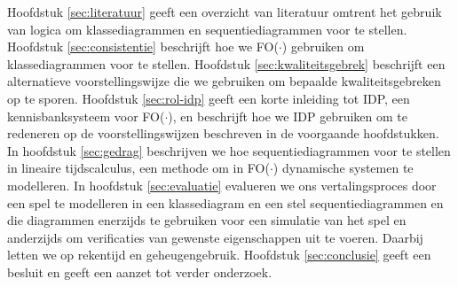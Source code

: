 Hoofdstuk \ref{sec:literatuur} geeft een overzicht van literatuur omtrent het gebruik van logica om klassediagrammen en sequentiediagrammen voor te stellen. Hoofdstuk \ref{sec:consistentie} beschrijft hoe we FO($\cdot$) gebruiken om klassediagrammen voor te stellen. Hoofdstuk \ref{sec:kwaliteitsgebrek} beschrijft een alternatieve voorstellingswijze die we gebruiken om bepaalde kwaliteitsgebreken op te sporen. Hoofdstuk \ref{sec:rol-idp} geeft een korte inleiding tot IDP\cite{DeCatBroes2014PLaa}, een kennisbanksysteem voor FO($\cdot$), en beschrijft hoe we IDP gebruiken om te redeneren op de voorstellingswijzen beschreven in de voorgaande hoofdstukken. In hoofdstuk \ref{sec:gedrag} beschrijven we hoe sequentiediagrammen voor te stellen in lineaire tijdscalculus\cite{BogaertsBart2014Sdsu}, een methode om in FO($\cdot$) dynamische systemen te modelleren. In hoofdstuk \ref{sec:evaluatie} evalueren we ons vertalingsproces door een spel te modelleren in een klassediagram en een stel sequentiediagrammen en die diagrammen enerzijds te gebruiken voor een simulatie van het spel en anderzijds om verificaties van gewenste eigenschappen uit te voeren. Daarbij letten we op rekentijd en geheugengebruik. Hoofdstuk \ref{sec:conclusie} geeft een besluit en geeft een aanzet tot verder onderzoek.